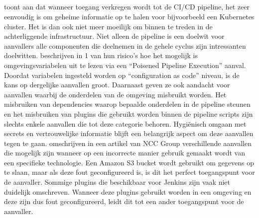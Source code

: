 \subsection{}
\label{sec:Aanvallen in de pipeline}
\textcite{Pecka2022} toont aan dat wanneer toegang verkregen wordt tot de CI/CD pipeline, het zeer eenvoudig is om geheime informatie op te halen voor bijvoorbeeld een Kubernetes cluster. Het is dan ook niet meer moeilijk om binnen te treden in de achterliggende infrastructuur. Niet alleen de pipeline is een doelwit voor aanvallers alle componenten die deelnemen in de gehele cyclus zijn intressanten doelwitten. \textcite{Security2022} beschrijven in 1 van hun risico's hoe het mogelijk is omgevingsvariabelen uit te lezen via een “Poisened Pipeline Execution” aanval. Doordat variabelen ingesteld worden op “configuration as code” niveau, is de kans op dergelijke aanvallen groot. Daarnaast geven ze ook aandacht voor aanvallen waarbij de onderdelen van de omgeving misbruikt worden. Het misbruiken van dependencies waarop bepaalde onderdelen in de pipeline steunen en het misbruiken van plugins die gebruikt worden binnen de pipeline scripts zijn slechts enkele aanvallen die tot deze categorie behoren. Hygiënisch omgaan met secrets en vertrouwelijke informatie blijft een belangrijk aspect om deze aanvallen tegen te gaan. \autocite{Haymore2022} omschrijven in een artikel van NCC Group verschillende aanvallen die mogelijk zijn wanneer op een incorrecte manier gebruik gemaakt wordt van een specifieke technologie. Een Amazon S3 bucket wordt gebruikt om gegevens op te slaan, maar als deze fout geconfigureerd is, is dit het perfect toegangspunt voor de aanvaller. Sommige plugins die beschikbaar voor Jenkins zijn vaak niet duidelijk omschreven. Wanneer deze plugins gebruikt worden in een omgeving en deze zijn dus fout geconfigureerd, leidt dit tot een ander toegangspunt voor de aanvaller.

